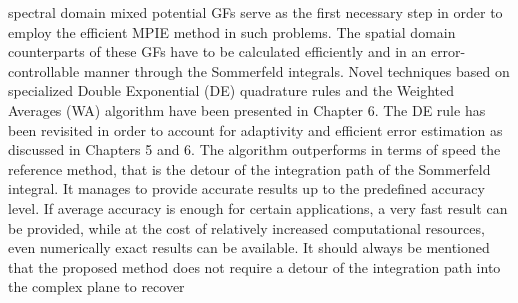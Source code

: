 spectral domain mixed potential GFs serve as the first necessary step in order to employ the
efficient MPIE method in such problems.
The spatial domain counterparts of these GFs have to be calculated efficiently and in
an error-controllable manner through the Sommerfeld integrals. Novel techniques based on
specialized Double Exponential (DE) quadrature rules and the Weighted Averages (WA)
algorithm have been presented in Chapter 6. The DE rule has been revisited in order to
account for adaptivity and efficient error estimation as discussed in Chapters 5 and 6. The
algorithm outperforms in terms of speed the reference method, that is the detour of the
integration path of the Sommerfeld integral. It manages to provide accurate results up to the
predefined accuracy level. If average accuracy is enough for certain applications, a very fast
result can be provided, while at the cost of relatively increased computational resources, even
numerically exact results can be available. It should always be mentioned that the proposed
method does not require a detour of the integration path into the complex plane to recover
